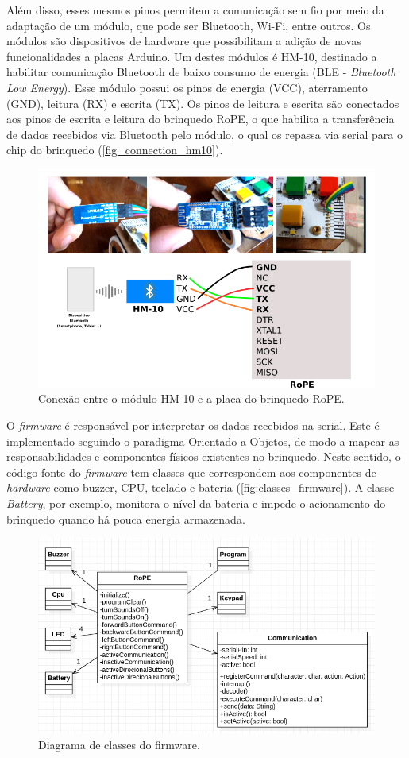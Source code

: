 Além disso, esses mesmos pinos permitem a comunicação sem fio por meio da adaptação de um módulo, que pode ser Bluetooth, Wi-Fi, entre outros. Os módulos são dispositivos de hardware que possibilitam a adição de novas funcionalidades a placas Arduino. Um destes módulos é HM-10, destinado a habilitar comunicação Bluetooth de baixo consumo de energia (BLE - \textit{Bluetooth Low Energy}). Esse módulo possui os pinos de energia (VCC), aterramento (GND), leitura (RX) e escrita (TX). Os pinos de leitura e escrita são conectados aos pinos de escrita e leitura do brinquedo RoPE, o que habilita a transferência de dados recebidos via Bluetooth pelo módulo, o qual os repassa via serial para o chip do brinquedo (\autoref{fig_connection_hm10}).

\begin{figure}[!h]
    \centering
    \includegraphics[width=.8\linewidth,fbox]{figs/connection_rope_hm10.png}
    \caption{Conexão entre o módulo HM-10 e a placa do brinquedo RoPE.}
    \label{fig_connection_hm10}
    \sourceauthor
\end{figure}

O \textit{firmware} é responsável por interpretar os dados recebidos na serial. Este é implementado seguindo o paradigma Orientado a Objetos, de modo a mapear as responsabilidades e componentes físicos existentes no brinquedo. Neste sentido, o código-fonte do \textit{firmware} tem classes que correspondem aos componentes de \textit{hardware} como buzzer, CPU, teclado e bateria (\autoref{fig:classes_firmware}). A classe \textit{Battery}, por exemplo, monitora o nível da bateria e impede o acionamento do brinquedo quando há pouca energia armazenada.

\begin{figure}[!h]
    \centering
    \includegraphics[width=.7\linewidth,fbox]{figs/class_diagram_firmware.png}
    \caption{Diagrama de classes do firmware.}
    \label{fig:classes_firmware}
    \sourceauthor
\end{figure}

